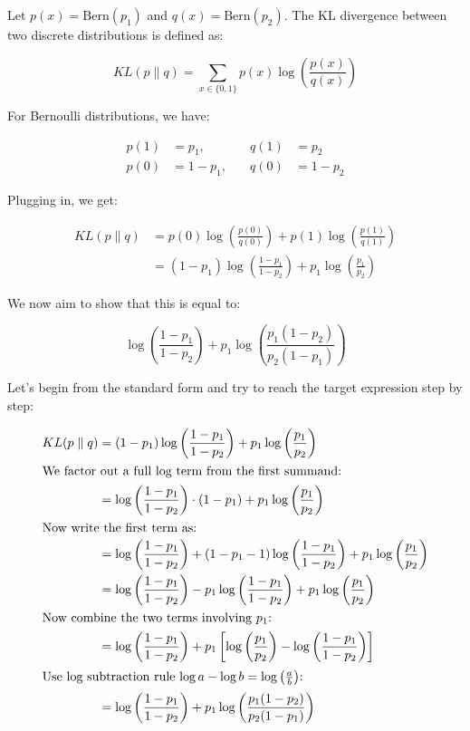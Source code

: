 \documentclass[10pt]{article}
\begin{document}
Let \( p(x) = \text{Bern}(p_1) \) and \( q(x) = \text{Bern}(p_2) \). The KL divergence between two discrete distributions is defined as:

\[
KL(p \parallel q) = \sum_{x \in \{0,1\}} p(x) \log \left( \frac{p(x)}{q(x)} \right)
\]

For Bernoulli distributions, we have:

\begin{align*}
p(1) &= p_1, &\quad q(1) &= p_2 \\
p(0) &= 1 - p_1, &\quad q(0) &= 1 - p_2
\end{align*}

\noindent Plugging in, we get:

\begin{align*}
KL(p \parallel q) &= p(0) \log \left( \frac{p(0)}{q(0)} \right) + p(1) \log \left( \frac{p(1)}{q(1)} \right) \\
&= (1 - p_1) \log \left( \frac{1 - p_1}{1 - p_2} \right) + p_1 \log \left( \frac{p_1}{p_2} \right)
\end{align*}

We now aim to show that this is equal to:

\[
\log \left( \frac{1 - p_1}{1 - p_2} \right) + p_1 \log \left( \frac{p_1 (1 - p_2)}{p_2 (1 - p_1)} \right)
\]

Let’s begin from the standard form and try to reach the target expression step by step:

\begin{align*}
KL(p \parallel q)
&= (1 - p_1) \log \left( \frac{1 - p_1}{1 - p_2} \right) + p_1 \log \left( \frac{p_1}{p_2} \right) \\
\intertext{We factor out a full log term from the first summand:}
&= \log \left( \frac{1 - p_1}{1 - p_2} \right) \cdot (1 - p_1) + p_1 \log \left( \frac{p_1}{p_2} \right) \\
\intertext{Now write the first term as:}
&= \log \left( \frac{1 - p_1}{1 - p_2} \right) + (1 - p_1 - 1) \log \left( \frac{1 - p_1}{1 - p_2} \right) + p_1 \log \left( \frac{p_1}{p_2} \right) \\
&= \log \left( \frac{1 - p_1}{1 - p_2} \right) - p_1 \log \left( \frac{1 - p_1}{1 - p_2} \right) + p_1 \log \left( \frac{p_1}{p_2} \right) \\
\intertext{Now combine the two terms involving \( p_1 \):}
&= \log \left( \frac{1 - p_1}{1 - p_2} \right) + p_1 \left[ \log \left( \frac{p_1}{p_2} \right) - \log \left( \frac{1 - p_1}{1 - p_2} \right) \right] \\
\intertext{Use log subtraction rule \( \log a - \log b = \log \left( \frac{a}{b} \right) \):}
&= \log \left( \frac{1 - p_1}{1 - p_2} \right) + p_1 \log \left( \frac{p_1 (1 - p_2)}{p_2 (1 - p_1)} \right)
\end{align*}
\end{document}
